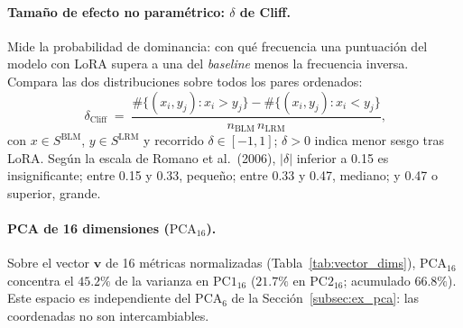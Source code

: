 \documentclass[12pt,a4paper]{report}
\newcommand{\vconfig}{\ensuremath{\mathbf{v}}}
\newcommand{\PCAsix}{\ensuremath{\mathrm{PCA}_6}}
\newcommand{\PCAsixteen}{\ensuremath{\mathrm{PCA}_{16}}}
\newcommand{\PConeSixteen}{\ensuremath{\mathrm{PC1}_{16}}}
\newcommand{\PCtwoSixteen}{\ensuremath{\mathrm{PC2}_{16}}}
\begin{document}
\paragraph{Tamaño de efecto no paramétrico: $\delta$ de Cliff.} Mide la probabilidad de dominancia: con qué frecuencia una puntuación del modelo con LoRA supera a una del \textit{baseline} menos la frecuencia inversa. Compara las dos distribuciones sobre todos los pares ordenados:
\begin{equation}
  \delta_{\mathrm{Cliff}} \;=\; \frac{\#\{(x_i,y_j):x_i>y_j\} - \#\{(x_i,y_j):x_i<y_j\}}{n_{\mathrm{BLM}}\,n_{\mathrm{LRM}}}\text{,}
  \label{eq:cliff}
\end{equation}
con $x\in S^{\mathrm{BLM}}$, $y\in S^{\mathrm{LRM}}$ y recorrido $\delta\in[-1,1]$; $\delta>0$ indica menor sesgo tras LoRA. Según la escala de Romano et al.\ (2006), $|\delta|$ inferior a 0.15 es insignificante; entre 0.15 y 0.33, pequeño; entre 0.33 y 0.47, mediano; y 0.47 o superior, grande.

\paragraph{PCA de 16 dimensiones (\PCAsixteen{}).} Sobre el vector \vconfig{} de 16 métricas normalizadas (Tabla~\ref{tab:vector_dims}), \PCAsixteen{} concentra el $45.2\%$ de la varianza en \PConeSixteen{} ($21.7\%$ en \PCtwoSixteen{}; acumulado $66.8\%$). Este espacio es independiente del \PCAsix{} de la Sección~\ref{subsec:ex_pca}: las coordenadas no son intercambiables.
\end{document}
